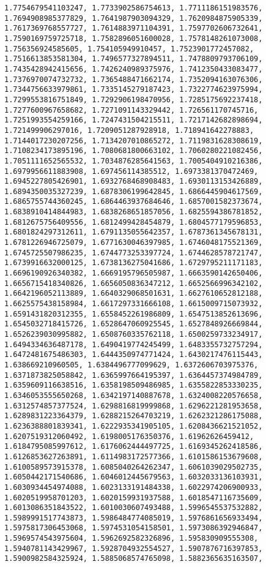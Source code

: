 \documentclass[11pt]{article}
\begin{document}
\begin{Verbatim}[commandchars=\\\{\}]
1.7754679541103247, 1.7733902586754613, 1.7711186151983576, 1.7694908985377829, 1.7641987903094329, 1.7620984875905339, 1.7617369768557727, 1.7614883971104391, 1.7597702606732641, 1.7590169759725718, 1.7582896051600028, 1.7578148261073008, 1.756356924585605, 1.754105949910457, 1.7523901772457082, 1.7516613853581304, 1.7496577327894511, 1.7478809793706109, 1.7435428942415656, 1.7426240989375976, 1.7412350433083477, 1.7376970074732732, 1.7365488471662174, 1.7352094163076306, 1.7344756633979861, 1.7335145279187423, 1.7322774623975994, 1.7299553816751849, 1.7292906198470956, 1.7285175692237418, 1.7277600967658682, 1.7271091143329442, 1.726561170745716, 1.7251993554259166, 1.7247431504215511, 1.7217142682898694, 1.721499906297016, 1.7209051287928918, 1.718941642278883, 1.7144017230207256, 1.7134207010865272, 1.7119831628308619, 1.7108234173895196, 1.7080681800663102, 1.7060280221082456, 1.7051111652565532, 1.7034876285641563, 1.7005404910216386, 1.6979956611883908, 1.697456114385512, 1.6973381370472469, 1.6945227805426901, 1.6932768468908483, 1.6930113153426889, 1.6894350035327239, 1.6878306199642845, 1.6866445904617569, 1.6865755744360245, 1.6864463937684646, 1.6857001582373674, 1.6838910414844983, 1.6838268651857056, 1.6825594386781852, 1.6812675756409556, 1.6812499428454879, 1.6804577179596853, 1.6801824297312611, 1.6791135055642357, 1.6787361345678131, 1.6781226946725079, 1.6771630046397985, 1.6746048175521369, 1.6745725507986235, 1.6744773253397724, 1.6744628578721747, 1.6739916632000125, 1.6738136275041686, 1.6729795211171183, 1.6696190926340382, 1.6669195796505987, 1.6663590142650406, 1.6656715418340826, 1.6656050836347212, 1.6652566996342102, 1.6642196052113889, 1.6640329068501631, 1.6627610652812188, 1.6625575438158984, 1.6617297331666108, 1.6615009715073932, 1.6591431820312355, 1.6558452261986809, 1.6547513852613696, 1.6545032718415726, 1.6528647060925545, 1.6527848926669844, 1.6526239030995882, 1.6508760335762118, 1.6500259733234917, 1.6494334636487178, 1.6490419774245499, 1.6483355732757294, 1.6472481675486303, 1.6444350974771424, 1.6430217476115443, 1.638669210960505, 1.6384496777099629, 1.6372606703975376, 1.6371873825058842, 1.6365997664195397, 1.6364457374984789, 1.6359609116638516, 1.6358198509486985, 1.6355822853330235, 1.6346053555650268, 1.6342197140887678, 1.6324008220576658, 1.6312574857377524, 1.6298816819999868, 1.6296221281953658, 1.6289831223364379, 1.6288215264703219, 1.6262321286175088, 1.6236388801839341, 1.6222935341905105, 1.6208436621521052, 1.6207519312060492, 1.6198005176350376, 1.61962626459412, 1.6184795085997612, 1.6176062444497725, 1.6169345262418586, 1.6126853627263891, 1.6114983172577366, 1.6101586153679608, 1.6100589573915378, 1.6085040264262347, 1.6061039029502735, 1.6050442171540686, 1.6046012445679563, 1.6032033136103931, 1.6030934454974088, 1.6023133191484338, 1.6022974206900933, 1.6020519958701203, 1.6020159931937588, 1.6018547116735609, 1.6013086351843522, 1.6010030607493488, 1.5996545537532882, 1.5989991517743873, 1.5986484774085019, 1.5976861656933494, 1.5975817306453068, 1.5974531054158501, 1.5973086392946847, 1.5969574543975604, 1.5962692582326896, 1.595830909555308, 1.5940781143429967, 1.5928704932554527, 1.5907876716397853, 1.5900982584325924, 1.5885068574765098, 1.5882365635163507, 
\end{Verbatim}
\end{document}
